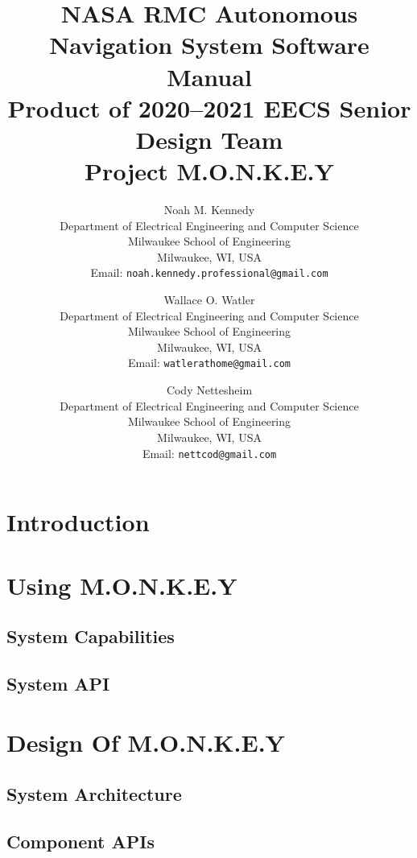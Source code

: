 \documentclass[8pt]{report}
\title{
    NASA RMC Autonomous Navigation System Software Manual \\
    Product of 2020--2021 EECS Senior Design Team \\
    Project M.O.N.K.E.Y
}
\author{
    Noah M. Kennedy \\[3pt]
    {\small Department of Electrical Engineering and Computer Science} \\
    {\small Milwaukee School of Engineering} \\
    {\small Milwaukee, WI, USA} \\
    {\small Email: {\texttt{noah.kennedy.professional@gmail.com} }} \\[12pt]
    \and
    Wallace O. Watler \\[3pt]
    {\small Department of Electrical Engineering and Computer Science} \\
    {\small Milwaukee School of Engineering} \\
    {\small Milwaukee, WI, USA} \\
    {\small Email: {\texttt{watlerathome@gmail.com} }} \\[12pt]
    \and
    Cody Nettesheim \\[3pt]
    {\small Department of Electrical Engineering and Computer Science} \\
    {\small Milwaukee School of Engineering} \\
    {\small Milwaukee, WI, USA} \\
    {\small Email: {\texttt{nettcod@gmail.com} }} \\[12pt]
}
\begin{document}
    \maketitle
    \newpage


    \tableofcontents
    \newpage


    \chapter{Introduction}\label{ch:introduction}
    
    \newpage


    \chapter{Using M.O.N.K.E.Y}\label{ch:using-monkey}
    \newpage


    \section{System Capabilities}\label{sec:system-capabilities}
    \newpage


    \section{System API}\label{sec:system-api}
    
    \newpage


    \chapter{Design Of M.O.N.K.E.Y}\label{ch:design-of-monkey}
    \newpage


    \section{System Architecture}\label{sec:system-architecture}
    
    \newpage


    \section{Component APIs}\label{sec:components}
    
    \newpage

    \appendix
    
    \newpage

    \printbibliography
\end{document}
